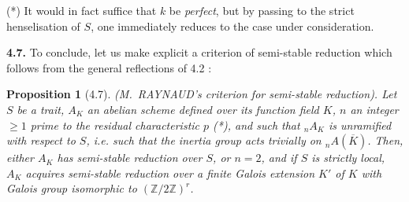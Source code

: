 \documentclass[11pt]{article}
\theoremstyle{plain}
\newtheorem{proposition}[theorem]{Proposition}
\theoremstyle{definition}
\theoremstyle{remark}
\newcommand{\ZZ}{\mathbb Z}
\begin{document}
\medskip

\noindent (*) It would in fact suffice that $k$ be \emph{perfect}, but
by passing to the strict henselisation of $S$, one immediately reduces
to the case under consideration.

\medskip

\noindent\textbf{4.7.} To conclude, let us make explicit a criterion of
semi-stable reduction which follows from the general reflections of 4.2 :

\begin{proposition}[4.7]
\emph{(M.~RAYNAUD's criterion for semi-stable reduction).} Let $S$ be a
trait, $A_K$ an abelian scheme defined over its function field $K$, $n$
an integer $\geq 1$ prime to the residual characteristic $p$ (*), and
such that ${}_n A_K$ is unramified with respect to $S$, i.e. such that
the inertia group acts trivially on ${}_n A(\overline{K})$. Then, either
$A_K$ has semi-stable reduction over $S$, or $n = 2$, and if $S$ is
strictly local, $A_K$ acquires semi-stable reduction over a finite
Galois extension $K'$ of $K$ with Galois group isomorphic to
$(\ZZ/2\ZZ)^r$.
\end{proposition}
\end{document}
